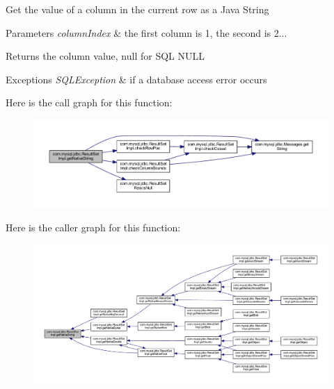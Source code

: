 Get the value of a column in the current row as a Java String


\begin{DoxyParams}{Parameters}
{\em column\+Index} & the first column is 1, the second is 2...\\
\hline
\end{DoxyParams}
\begin{DoxyReturn}{Returns}
the column value, null for S\+QL N\+U\+LL
\end{DoxyReturn}

\begin{DoxyExceptions}{Exceptions}
{\em S\+Q\+L\+Exception} & if a database access error occurs \\
\hline
\end{DoxyExceptions}
Here is the call graph for this function\+:
\nopagebreak
\begin{figure}[H]
\begin{center}
\leavevmode
\includegraphics[width=350pt]{classcom_1_1mysql_1_1jdbc_1_1_result_set_impl_aa58d90e37ce9380803aa9b3bac02ffa2_cgraph}
\end{center}
\end{figure}
Here is the caller graph for this function\+:
\nopagebreak
\begin{figure}[H]
\begin{center}
\leavevmode
\includegraphics[width=350pt]{classcom_1_1mysql_1_1jdbc_1_1_result_set_impl_aa58d90e37ce9380803aa9b3bac02ffa2_icgraph}
\end{center}
\end{figure}
\mbox{\label{classcom_1_1mysql_1_1jdbc_1_1_result_set_impl_a83d3f3839270765b9b934fc524a0e04e}} 

